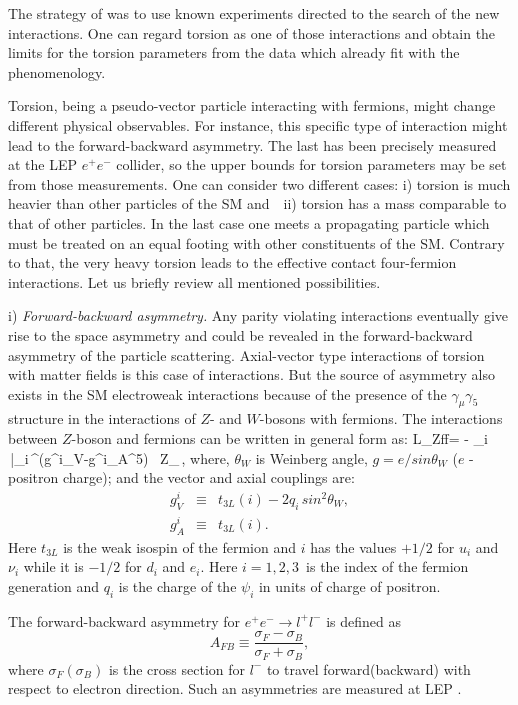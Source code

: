 The strategy of \cite{betor} was to use known experiments 
directed to the search of the new interactions. One can regard torsion 
as one of those interactions and obtain the limits for the torsion 
parameters from the data which already fit with the phenomenology. 

Torsion, being a pseudo-vector particle interacting with fermions, 
might change different physical observables. For instance, 
this specific type of
interaction might lead to the forward-backward asymmetry. The last has 
been precisely measured at the LEP $e^+e^-$ collider, so the upper 
bounds for torsion parameters may be set from those measurements.  
One can consider two different cases: 
i) torsion is much heavier than other particles of the SM and 
$\,\,$ 
ii) torsion has a mass comparable to that of other particles. 
In the last case one meets a propagating particle which must be 
treated 
on an equal footing with other constituents of the SM.  Contrary to 
that, the very heavy torsion leads to the effective contact 
four-fermion interactions. Let us briefly review all mentioned 
possibilities.
\vskip 3mm

i) {\large\it Forward-backward asymmetry.}
Any parity violating interactions eventually give rise to the space
asymmetry and could be revealed in the  
forward-backward asymmetry of the particle scattering. 
Axial-vector type interactions of torsion with matter fields is
this case of interactions. But the  source 
of asymmetry also exists in the SM electroweak interactions  
because of the presence of the $\gamma_\mu\gamma_5$ structure in
the  interactions of $Z$- and $W$-bosons with  fermions.
The interactions between $Z$-boson and fermions can be written in
general form as:
\beq
L_{Zff}= -
\sum_i \,{\bar {\psi}}_i\,\gamma^\mu(g^i_V-g^i_A\gamma^5) \psi\, 
Z_\mu\,,
\label{zff}
\eeq
where, $\theta_W$ is Weinberg angle, $g=e/sin\theta_W$
 ($e$ - positron charge); 
and the vector and axial couplings are:
\begin{eqnarray}
g_V^i&\equiv& t_{3L}(i)- 2 q_i\, sin^2\theta_W,\\
g_A^i&\equiv& t_{3L}(i).
\label{ga}
\end{eqnarray}
Here $t_{3L}$ is the weak isospin of the fermion
and $i$ has the values $+1/2$ for $u_i$ and $\nu_i$ while it is 
$-1/2$ for $d_i$ and $e_i$. Here
$i=1,2,3\,$ is the index of the fermion generation and
$q_i$ is the charge of the $\psi_i$ in  units of charge of positron.

The forward-backward asymmetry for $e^+e^- \rightarrow l^+l^-$ 
is defined as 
\begin{equation}
A_{FB}\equiv \frac{\sigma_F-\sigma_B}{\sigma_F+\sigma_B},
\label{asym}
\end{equation}
where $\sigma_F(\sigma_B)$ is the cross section for $l^-$
to travel forward(backward) with 
respect to electron direction. Such an asymmetries are measured
 at LEP \cite{ewdata}.

